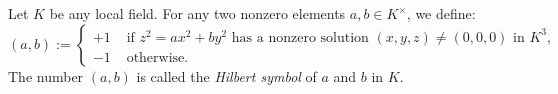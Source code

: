 \documentclass[12pt]{article}
\begin{document}
Let $K$ be any local field. For any two nonzero elements $a,b \in K^\times$, we define:
$$
(a,b) :=
\begin{cases}
+1 & \text{ if $z^2 = ax^2 + by^2$ has a nonzero solution $(x,y,z) \neq (0,0,0)$ in $K^3$,} \\
-1 & \text{ otherwise.}
\end{cases}
$$
The number $(a,b)$ is called the {\em Hilbert symbol} of $a$ and $b$ in $K$.
\end{document}
